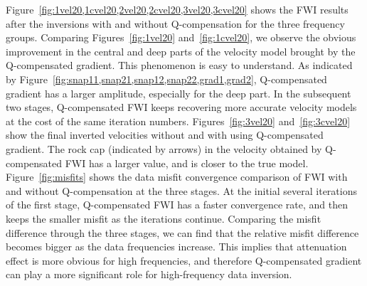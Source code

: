 
Figure~\ref{fig:1vel20,1cvel20,2vel20,2cvel20,3vel20,3cvel20} shows the FWI results after the inversions with and without Q-compensation for the three frequency groups.
Comparing Figures~\ref{fig:1vel20} and~\ref{fig:1cvel20}, we observe the obvious improvement in the central and deep parts of the velocity model brought by the Q-compensated gradient.
This phenomenon is easy to understand.
As indicated by Figure~\ref{fig:snap11,snap21,snap12,snap22,grad1,grad2}, Q-compensated gradient has a larger amplitude, especially for the deep part.
In the subsequent two stages, Q-compensated FWI keeps recovering more accurate velocity models at the cost of the same iteration numbers.
Figures~\ref{fig:3vel20} and~\ref{fig:3cvel20} show the final inverted velocities without and with using Q-compensated gradient.
The rock cap (indicated by arrows) in the velocity obtained by Q-compensated FWI has a larger value, and is closer to the true model.
Figure~\ref{fig:misfits} shows the data misfit convergence comparison of FWI with and without Q-compensation at the three stages.
At the initial several iterations of the first stage, Q-compensated FWI has a faster convergence rate, and then keeps the smaller misfit as the iterations continue.
Comparing the misfit difference through the three stages, we can find that the relative misfit difference becomes bigger as the data frequencies increase.
This implies that attenuation effect is more obvious for high frequencies, and therefore Q-compensated gradient can play a more significant role for high-frequency data inversion.

